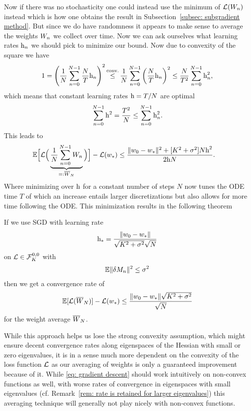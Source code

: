 Now if there was no stochasticity one could instead use the minimum of
\(\Loss(\Weights_n)\) instead which is how one obtains the result in
Subsection~\ref{subsec: subgradient method}. But since we do have randomness
it appears to make sense to average the weights \(\Weights_n\) we collect over
time.
Now we can ask ourselves what learning rates \(\lr_n\) we should pick to
minimize our bound. Now due to convexity of the square we have
\begin{align*}
	1 = \left(\frac{1}{N}\sum_{n=0}^{N-1}\frac{N}{T}\lr_n\right)^2
	\xle{\text{conv.}} \frac{1}{N}\sum_{n=0}^{N-1}\left(\frac{N}{T}\lr_n\right)^2
	\le \frac{N}{T^2}\sum_{n=0}^{N-1}\lr_n^2,
\end{align*}
which means that constant learning rates \(\lr=T/N\) are optimal
\begin{align*}
	\sum_{n=0}^{N-1}\lr^2 = \frac{T^2}{N} \le \sum_{n=0}^{N-1}\lr_n^2.
\end{align*}
This leads to
\begin{align*}
	\E\Big[
		\Loss\Big(\underbrace{
			\frac{1}{N}\sum_{n=0}^{N-1}\Weights_n
		}_{=:\overline{\Weights}_N}\Big)
	\Big]-\Loss(\minimum)
	&\le \frac{
		\|\weights_0 - \minimum\|^2 + [\lipConst^2+\stdBound^2]N\lr^2
	}{2\lr N}.
\end{align*}
Where minimizing over \(\lr\) for a constant number of steps \(N\) now tunes the
ODE time \(T\) of which an increase entails larger discretizations but also
allows for more time following the ODE.
This minimization results in the following theorem
\begin{theorem}\label{thm: optimal averaging rates}
	If we use SGD with learning rate
	\begin{align*}
		\lr_* = \frac{\|\weights_0-\minimum\|}{\sqrt{\lipConst^2+\stdBound^2}\sqrt{N}}
	\end{align*}
	on \(\Loss\in\lipGradientSet[0,0]{\lipConst}\) with
	\begin{align*}
		\E\|\martIncr_n\|^2 \le \stdBound^2	
	\end{align*}
	then we get a convergence rate of
	\begin{align*}
		\E[\Loss(\overline{\Weights}_N)] -\Loss(\minimum)
		\le \frac{\|\weights_0-\minimum\|\sqrt{\lipConst^2+\stdBound^2}}{\sqrt{N}}
	\end{align*}
	for the weight average \(\overline{\Weights}_N\).
\end{theorem}

While this approach helps us lose the strong convexity assumption, which might
ensure decent convergence rates along eigenspaces of the Hessian with
small or zero eigenvalues, it is in a sense much more dependent on the convexity
of the loss function \(\Loss\) as our averaging of weights is only a
guaranteed improvement because of it. While \ref{eq: gradient descent} should work
intuitively on non-convex functions as well, with worse rates of convergence in
eigenspaces with small eigenvalues (cf. Remark~\ref{rem: rate is retained for
larger eigenvalues}) this averaging technique will generally not play nicely
with non-convex functions.

